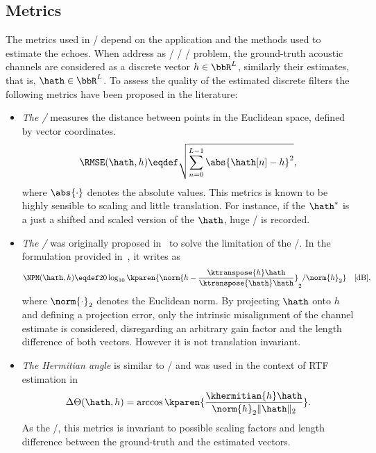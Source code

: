 \subsection{Metrics}
The metrics used in \AER/ depend on the application and the methods used to estimate the echoes.
When address as \FIR/ \SIMO/ \BCE/ problem, the ground-truth acoustic channels are considered as a discrete vector $h \in \bbR^L$, similarly their estimates, that is, $\hath \in \bbR^L$.
To assess the quality of the estimated discrete filters the following metrics have been proposed in the literature:
\begin{itemize}
    \item \textit{The \RMSEtxt/}  measures the distance between points in the Euclidean space, defined by vector coordinates.
    \begin{equation}
        \RMSE(\hath, h) \eqdef \sqrt{\sum_{n=0}^{L-1} \abs{\hath[n] - h}^2}
        ,
    \end{equation}
    where $\abs{\cdot}$ denotes the absolute values.
    This metrics is known to be highly sensible to scaling and little translation.
    For instance, if the $\hath^{*}$ is a just a shifted and scaled version of the $\hath$, huge \RMSEtxt/ is recorded.

    \item \textit{The \NPMtxt/}  was originally proposed in~ to solve the limitation of the \RMSEtxt/.
    In the formulation provided in~, it writes as
    \begin{equation}
        \NPM(\hath,h) \eqdef 20 \log_{10} \kparen{ \norm{h - \frac{\ktranspose{h}\hath}{\ktranspose{\hath} \hath}}_2 / \norm{h}_2} \quad \text{[dB]}
        ,
    \end{equation}
    where $\norm{\cdot}_2$ denotes the Euclidean norm.
    By projecting $\hath$ onto $h$ and defining a projection error, only the intrinsic misalignment of the channel estimate is considered, disregarding an arbitrary gain factor and the length difference of both vectors.
    However it is not translation invariant.

    \item \textit{The Hermitian angle} is similar to \NPMtxt/ and was used in the context of RTF estimation in~
    \begin{equation}
        \Delta\Theta(\hath,h) = \arccos\kparen{\frac{\khermitian{h}\hath}{\norm{h}_2\|\hath\|_2}}
        .
    \end{equation}
    As the \NPMtxt/, this metrics is invariant to possible scaling factors and length difference between the ground-truth and the estimated vectors.
\end{itemize}


